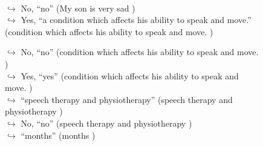 \documentclass[11pt,a4paper, onecolumn]{article}
\begin{document}
\begin{figure}[t]
\begin{tcolorbox}[boxsep=0pt,left=5pt,right=0pt,top=2pt,colback = yellow!5]
\begin{dialogue}
\\
\colorbox{pink!25}{$\hookrightarrow$}
\colorbox{red!25}{No,}
{ ``no'' (My son is very sad ) }
\\
\colorbox{pink!25}{$\hookrightarrow$}
\colorbox{red!25}{Yes,}
{ ``a condition which affects his ability to speak and move.'' (condition which affects his ability to speak and move. ) }
\\
 \end{dialogue}\end{tcolorbox}\end{figure}\begin{figure}[t] \small \begin{tcolorbox}[boxsep=0pt,left=5pt,right=0pt,top=2pt,colback = yellow!5] \begin{dialogue}
 \small 
\colorbox{pink!25}{$\hookrightarrow$}
\colorbox{red!25}{No,}
{ ``no'' (condition which affects his ability to speak and move. ) }
\\
\colorbox{pink!25}{$\hookrightarrow$}
\colorbox{red!25}{Yes,}
{ ``yes'' (condition which affects his ability to speak and move. ) }
\\
\colorbox{pink!25}{$\hookrightarrow$}
{ ``speech therapy and physiotherapy'' (speech therapy and physiotherapy ) }
\\
\colorbox{pink!25}{$\hookrightarrow$}
\colorbox{red!25}{No,}
{ ``no'' (speech therapy and physiotherapy ) }
\\
\colorbox{pink!25}{$\hookrightarrow$}
{ ``months'' (months ) }
\\
 \end{dialogue}\end{tcolorbox}\end{figure}
\end{document}
